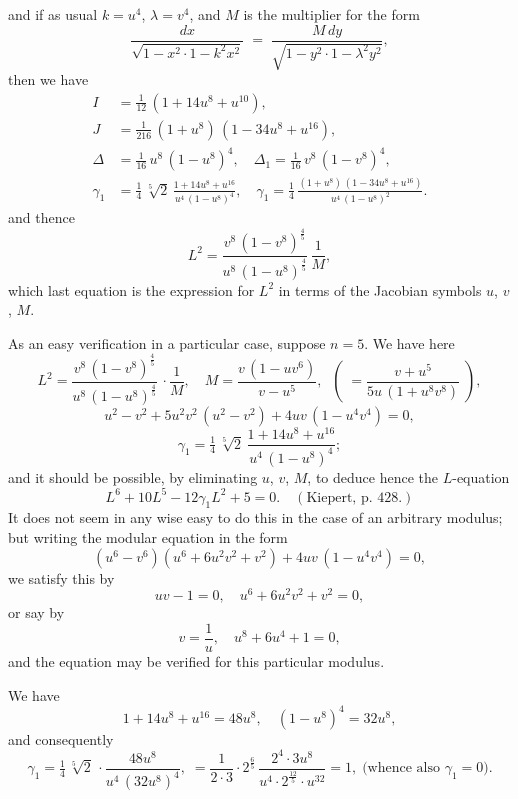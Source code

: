 \documentclass[11pt]{article}
\begin{document}
\noindent and if as usual $k = u^{4}$, $\lambda = v^{4}$, and $M$ is the multiplier for the form
\[
\frac{dx}{\sqrt{1-x^{2}\cdot 1 - k^{2}x^{2}}}\;=\;\frac{M\,dy}{\sqrt{1-y^{2}\cdot 1 - \lambda^{2}y^{2}}},
\]
then we have
\begin{align*}
I &= \tfrac{1}{12}\,(1 + 14u^{8} + u^{10}), \\
J &= \tfrac{1}{216}\,(1 + u^{8})\,(1 - 34u^{8} + u^{16}), \\
\Delta &= \tfrac{1}{16}\,u^{8}\,(1 - u^{8})^{4},\quad \Delta_{1} = \tfrac{1}{16}\,v^{8}\,(1 - v^{8})^{4}, \\
\gamma_{1} &= \tfrac{1}{4}\,\sqrt[5]{2}\,\frac{1 + 14u^{8} + u^{16}}{u^{4}\,(1 - u^{8})^{4}},\quad \gamma_{1} = \tfrac{1}{4}\,\frac{(1 + u^{8})\,(1 - 34u^{8} + u^{16})}{u^{4}\,(1 - u^{8})^{2}}.
\end{align*}
and thence
\[
L^{2} = \frac{v^{8}\,(1 - v^{8})^{\frac{4}{5}}}{u^{8}\,(1 - u^{8})^{\frac{4}{5}}}\,\frac{1}{M},
\]
which last equation is the expression for $L^{2}$ in terms of the Jacobian symbols $u$, $v$, $M$.

\medskip

As an easy verification in a particular case, suppose $n = 5$. We have here
\[
L^{2} = \frac{v^{8}\,(1 - v^{8})^{\frac{4}{5}}}{u^{8}\,(1 - u^{8})^{\frac{4}{5}}}\,\cdot \frac{1}{M},\quad M = \frac{v\,(1 - uv^{6})}{v - u^{5}},\;\;\left(\;= \frac{v + u^{5}}{5u\,(1 + u^{8}v^{8})}\;\right),
\]
\[
u^{2} - v^{2} + 5u^{2}v^{2}\,(u^{2} - v^{2}) + 4uv\,(1 - u^{4}v^{4}) = 0,
\]
\[
\gamma_{1} = \tfrac{1}{4}\,\sqrt[5]{2}\,\frac{1 + 14u^{8} + u^{16}}{u^{4}\,(1 - u^{8})^{4}};
\]
and it should be possible, by eliminating $u$, $v$, $M$, to deduce hence the $L$-equation
\[
L^{6} + 10L^{5} - 12\gamma_{1}L^{2} + 5 = 0.\quad (\text{Kiepert, p.~428.})
\]
It does not seem in any wise easy to do this in the case of an arbitrary modulus; but writing the modular equation in the form
\[
(u^{6} - v^{6})(u^{6} + 6u^{2}v^{2} + v^{2}) + 4uv\,(1 - u^{4}v^{4}) = 0,
\]
we satisfy this by
\[
uv - 1 = 0,\quad u^{6} + 6u^{2}v^{2} + v^{2} = 0,
\]
or say by
\[
v = \frac{1}{u},\quad u^{8} + 6u^{4} + 1 = 0,
\]
and the equation may be verified for this particular modulus.

We have
\[
1 + 14u^{8} + u^{16} = 48u^{8},\quad (1 - u^{8})^{4} = 32u^{8},
\]
and consequently
\[
\gamma_{1} = \tfrac{1}{4}\,\sqrt[5]{2}\,\cdot\frac{48u^{8}}{u^{4}\,(32u^{8})^{4}},\;= \frac{1}{2\cdot 3}\cdot 2^{\frac{6}{5}}\,\frac{2^{4}\cdot 3u^{8}}{u^{4}\cdot 2^{\frac{12}{5}}\cdot u^{32}} = 1,\;\text{(whence also $\gamma_{1} = 0$).}
\]
\end{document}
